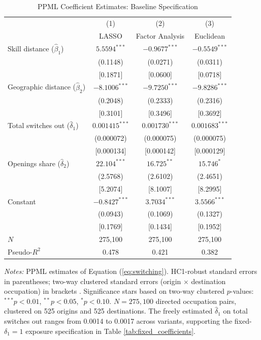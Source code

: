 \documentclass[12pt]{article}
\begin{document}
\begin{table}[H]
\centering
\caption{PPML Coefficient Estimates: Baseline Specification}
\label{tab:full_coefficients}
\begin{tabular}{lccc}
\toprule
 & (1) & (2) & (3) \\
 & LASSO & Factor Analysis & Euclidean \\
\midrule
Skill distance ($\hat{\beta}_1$) & $5.5594^{***}$ & $-0.9677^{***}$ & $-0.5549^{***}$ \\
 & (0.1148) & (0.0271) & (0.0311) \\
 & [0.1871] & [0.0600] & [0.0718]\\[0.5em]
Geographic distance ($\hat{\beta}_2$) & $-8.1006^{***}$ & $-9.7250^{***}$ & $-9.8286^{***}$ \\
 & (0.2048) & (0.2333) & (0.2316) \\
 & [0.3101] & [0.3496] & [0.3692]\\[0.5em]
Total switches out ($\hat{\delta}_1$) & $0.001415^{***}$ & $0.001730^{***}$ & $0.001683^{***}$ \\
 & (0.000072) & (0.000075) & (0.000075) \\
 & [0.000134] & [0.000142] & [0.000129]\\[0.5em]
Openings share ($\hat{\delta}_2$) & $22.104^{***}$ & $16.725^{**}$ & $15.746^{*}$ \\
 & (2.5768) & (2.6102) & (2.4651) \\
 & [5.2074] & [8.1007] & [8.2995]\\[0.5em]
Constant & $-0.8427^{***}$ & $3.7034^{***}$ & $3.5566^{***}$ \\
 & (0.0943) & (0.1069) & (0.1327) \\
 & [0.1769] & [0.1434] & [0.1952] \\
\midrule
$N$ & 275,100 & 275,100 & 275,100 \\
Pseudo-$R^2$ & 0.478 & 0.421 & 0.382 \\
\bottomrule
\end{tabular}
\begin{minipage}{0.9\textwidth}
\vspace{0.5em}
\footnotesize \textit{Notes:} PPML estimates of Equation (\ref{eq:switching}). HC1-robust standard errors in parentheses; two-way clustered standard errors (origin $\times$ destination occupation) in brackets \citep{cameron2011}. Significance stars based on two-way clustered $p$-values: $^{***}p<0.01$, $^{**}p<0.05$, $^{*}p<0.10$. $N = 275{,}100$ directed occupation pairs, clustered on 525 origins and 525 destinations. The freely estimated $\hat{\delta}_1$ on total switches out ranges from 0.0014 to 0.0017 across variants, supporting the fixed-$\delta_1 = 1$ exposure specification in Table \ref{tab:fixed_coefficients}.
\end{minipage}
\end{table}
\end{document}
